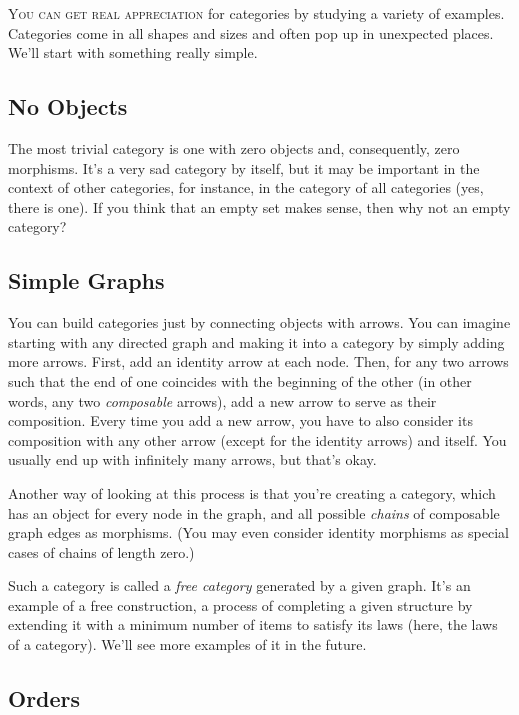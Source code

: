 \lettrine[lhang=0.17]{Y}{ou can get real appreciation} for categories by studying a variety of
examples. Categories come in all shapes and sizes and often pop up in
unexpected places. We'll start with something really simple.

\subsection{No Objects}\label{no-objects}

The most trivial category is one with zero objects and, consequently,
zero morphisms. It's a very sad category by itself, but it may be
important in the context of other categories, for instance, in the
category of all categories (yes, there is one). If you think that an
empty set makes sense, then why not an empty category?

\subsection{Simple Graphs}\label{simple-graphs}

You can build categories just by connecting objects with arrows. You can
imagine starting with any directed graph and making it into a category
by simply adding more arrows. First, add an identity arrow at each node.
Then, for any two arrows such that the end of one coincides with the
beginning of the other (in other words, any two \emph{composable}
arrows), add a new arrow to serve as their composition. Every time you
add a new arrow, you have to also consider its composition with any
other arrow (except for the identity arrows) and itself. You usually end
up with infinitely many arrows, but that's okay.

Another way of looking at this process is that you're creating a
category, which has an object for every node in the graph, and all
possible \emph{chains} of composable graph edges as morphisms. (You may
even consider identity morphisms as special cases of chains of length
zero.)

Such a category is called a \emph{free category} generated by a given
graph. It's an example of a free construction, a process of completing a
given structure by extending it with a minimum number of items to
satisfy its laws (here, the laws of a category). We'll see more examples
of it in the future.

\subsection{Orders}\label{orders}

